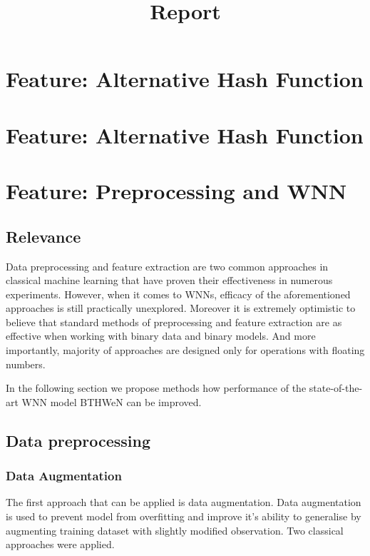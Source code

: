 \documentclass{article}[12pt]
\title{Report}
\author{}
\begin{document}
\maketitle

\newpage
\tableofcontents
\newpage


\newpage
\section{Feature: Alternative
Hash Function}\label{sec:feature:-alternative
hash-function}



\newpage
\section{Feature: Alternative
Hash Function}

\newpage
\section{Feature: Preprocessing
and WNN}
\subsection{Relevance}
Data preprocessing and feature extraction are two common approaches in classical machine learning that have proven their effectiveness in numerous experiments. However, when it comes to WNNs, efficacy of the aforementioned approaches is still practically unexplored. Moreover it is extremely optimistic to believe that standard methods of preprocessing and feature extraction are as effective when working with binary data and binary models. And more importantly, majority of approaches are designed only for operations with floating numbers.

In the following section we propose methods how performance of the state-of-the-art WNN model BTHWeN can be improved.

\subsection{Data preprocessing}
\subsubsection*{Data Augmentation}
The first approach that can be applied is data augmentation. Data augmentation is used to prevent model from overfitting and improve it's ability to generalise by augmenting training dataset with slightly modified observation. Two classical approaches were applied.
\end{document}
